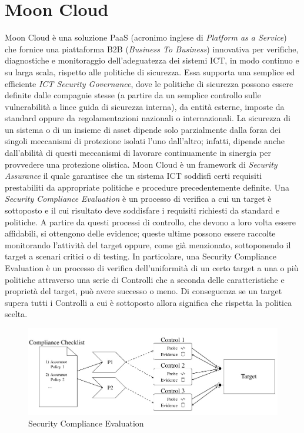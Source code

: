 \section{Moon Cloud}
Moon Cloud è una soluzione PaaS (acronimo inglese di \textit{Platform as a Service}) che fornice una piattaforma B2B 
(\textit{Business To Business}) innovativa per verifiche, diagnostiche e monitoraggio dell'adeguatezza dei sistemi ICT, in modo continuo e su larga scala,
rispetto alle politiche di sicurezza. Essa supporta una semplice ed efficiente \textit{ICT Security Governance}, dove le politiche 
di sicurezza possono essere definite dalle compagnie stesse (a partire da un semplice controllo sulle vulnerabilità a linee guida di
sicurezza interna), da entità esterne, imposte da standard oppure da regolamentazioni nazionali o internazionali.
La sicurezza di un sistema o di un insieme di asset dipende solo parzialmente dalla forza dei singoli meccanismi di protezione isolati
l'uno dall'altro; infatti, dipende anche dall'abilità di questi meccanismi di lavorare continuamente in sinergia per provvedere una 
protezione olistica.\hfill\break
Moon Cloud è un framework di \textit{Security Assurance} il quale garantisce che un sistema ICT soddisfi certi requisiti 
prestabiliti da appropriate politiche e procedure precedentemente definite. Una \textit{Security Compliance Evaluation} è un processo 
di verifica a cui un target è sottoposto e il cui risultato deve soddisfare i requisiti richiesti da standard e politiche. A partire da questi 
processi di controllo, che devono a loro volta essere affidabili, si ottengono delle evidence; queste ultime possono essere raccolte 
monitorando l'attività del target oppure, come già menzionato, sottoponendo il target a scenari critici o di testing.\hfill\break
In particolare, una Security Compliance Evaluation è un processo di verifica dell'uniformità di un certo target a una o più politiche 
attraverso una serie di Controlli che a seconda delle caratteristiche e proprietà del target, può avere successo o meno. Di 
conseguenza se un target supera tutti i Controlli a cui è sottoposto allora significa che rispetta la politica scelta.
\begin{figure}[ht!]
    \includegraphics[scale=0.53]{images/Security_Compliance_Evaluation.jpg}
    \caption[Security Compliance Evaluation]{Security Compliance Evaluation}
    \label{fig:Security_Compliance_Evaluation}
\end{figure}
